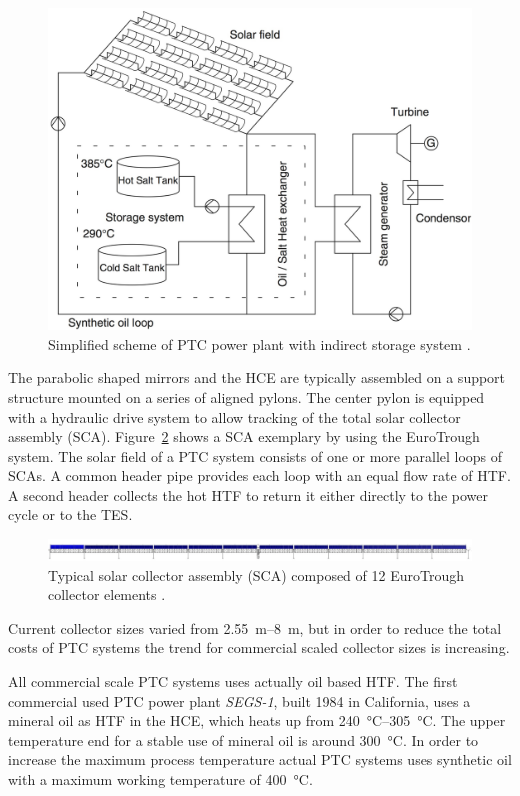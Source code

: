 \begin{figure}[htbp]  
\centering
\includegraphics[width=0.65\linewidth]{FIG/troughtindirecttwotank}
\caption[Simplified scheme of PTC power plant with indirect storage system.]{Simplified scheme of PTC power plant with indirect storage system \cite{Steinmann2012}.}\label{troughtindirecttwotank}
\end{figure}
The parabolic shaped mirrors and the HCE are typically assembled on a support structure mounted on a series of aligned pylons. The center pylon is equipped with a hydraulic drive system to allow tracking of the total solar collector assembly (SCA). Figure~\ref{SCA_EuroTrough} shows a SCA exemplary by using the EuroTrough system. The solar field of a PTC system consists of one or more parallel loops of SCAs. A common header pipe provides each loop with an equal flow rate of HTF. A second header collects the hot HTF to return it either directly to the power cycle or to the TES. \cite{Lupfert2013,Maccari2015}

\begin{figure}[htbp] 
\centering
\includegraphics[width=1\linewidth]{FIG/SCA_EuroTrough}
\caption[Typical solar collector assembly composed of 12 EuroTrough collector elements.]{Typical solar collector assembly (SCA) composed of 12 EuroTrough collector elements \cite{VonReeken2014}.}\label{SCA_EuroTrough}
\end{figure}
Current collector sizes varied from \SIrange{2.55}{8}{\metre}, but in order to reduce the total costs of PTC systems the trend for commercial scaled collector sizes is increasing. \cite{AbengoaSolar2013b,Pitz-Paal.2013,VonReeken2014}

All commercial scale PTC systems uses actually oil based HTF. The first commercial used PTC power plant \emph{SEGS-1}, built 1984 in California, uses a mineral oil as HTF in the HCE, which heats up from \SIrange{240}{305}{\celsius}. The upper temperature end for a stable use of mineral oil is around \SI{300}{\celsius}. In order to increase the maximum process temperature actual PTC systems uses synthetic oil with a maximum working temperature of \SI{400}{\celsius}. \cite{Gil2010,Richter2013,Therminol2015}

